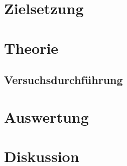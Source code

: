 \maketitle
\tableofcontents
\newpage

\section{Zielsetzung}
\section{Theorie}

\subsection{Versuchsdurchführung}

\section{Auswertung}

\section{Diskussion}
\newpage
\nocite{*}
\printbibliography
